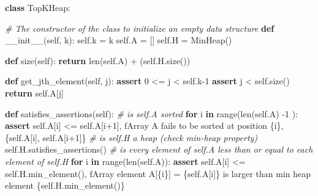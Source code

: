 \documentclass[
]{article}
\newenvironment{Shaded}{}{}
\newcommand{\BuiltInTok}[1]{\textcolor[rgb]{0.00,0.50,0.00}{#1}}
\newcommand{\CommentTok}[1]{\textcolor[rgb]{0.38,0.63,0.69}{\textit{#1}}}
\newcommand{\ControlFlowTok}[1]{\textcolor[rgb]{0.00,0.44,0.13}{\textbf{#1}}}
\newcommand{\DecValTok}[1]{\textcolor[rgb]{0.25,0.63,0.44}{#1}}
\newcommand{\FunctionTok}[1]{\textcolor[rgb]{0.02,0.16,0.49}{#1}}
\newcommand{\KeywordTok}[1]{\textcolor[rgb]{0.00,0.44,0.13}{\textbf{#1}}}
\newcommand{\NormalTok}[1]{#1}
\newcommand{\OperatorTok}[1]{\textcolor[rgb]{0.40,0.40,0.40}{#1}}
\newcommand{\SpecialCharTok}[1]{\textcolor[rgb]{0.25,0.44,0.63}{#1}}
\newcommand{\SpecialStringTok}[1]{\textcolor[rgb]{0.73,0.40,0.53}{#1}}
\newcommand{\VariableTok}[1]{\textcolor[rgb]{0.10,0.09,0.49}{#1}}
\begin{document}
\begin{Shaded}
\begin{Highlighting}[]
\KeywordTok{class}\NormalTok{ TopKHeap:}

    \CommentTok{\# The constructor of the class to initialize an empty data structure}
    \KeywordTok{def} \FunctionTok{\_\_init\_\_}\NormalTok{(}\VariableTok{self}\NormalTok{, k):}
        \VariableTok{self}\NormalTok{.k }\OperatorTok{=}\NormalTok{ k}
        \VariableTok{self}\NormalTok{.A }\OperatorTok{=}\NormalTok{ []}
        \VariableTok{self}\NormalTok{.H }\OperatorTok{=}\NormalTok{ MinHeap()}

    \KeywordTok{def}\NormalTok{ size(}\VariableTok{self}\NormalTok{):}
        \ControlFlowTok{return} \BuiltInTok{len}\NormalTok{(}\VariableTok{self}\NormalTok{.A) }\OperatorTok{+}\NormalTok{ (}\VariableTok{self}\NormalTok{.H.size())}

    \KeywordTok{def}\NormalTok{ get\_jth\_element(}\VariableTok{self}\NormalTok{, j):}
        \ControlFlowTok{assert} \DecValTok{0} \OperatorTok{\textless{}=}\NormalTok{ j }\OperatorTok{\textless{}} \VariableTok{self}\NormalTok{.k}\OperatorTok{{-}}\DecValTok{1}
        \ControlFlowTok{assert}\NormalTok{ j }\OperatorTok{\textless{}} \VariableTok{self}\NormalTok{.size()}
        \ControlFlowTok{return} \VariableTok{self}\NormalTok{.A[j]}

    \KeywordTok{def}\NormalTok{ satisfies\_assertions(}\VariableTok{self}\NormalTok{):}
        \CommentTok{\# is self.A sorted}
        \ControlFlowTok{for}\NormalTok{ i }\KeywordTok{in} \BuiltInTok{range}\NormalTok{(}\BuiltInTok{len}\NormalTok{(}\VariableTok{self}\NormalTok{.A) }\OperatorTok{{-}}\DecValTok{1}\NormalTok{ ):}
            \ControlFlowTok{assert} \VariableTok{self}\NormalTok{.A[i] }\OperatorTok{\textless{}=} \VariableTok{self}\NormalTok{.A[i}\OperatorTok{+}\DecValTok{1}\NormalTok{], }\SpecialStringTok{f\textquotesingle{}Array A fails to be sorted at position }\SpecialCharTok{\{}\NormalTok{i}\SpecialCharTok{\}}\SpecialStringTok{, }\SpecialCharTok{\{}\VariableTok{self}\SpecialCharTok{.}\NormalTok{A[i]}\SpecialCharTok{,} \VariableTok{self}\SpecialCharTok{.}\NormalTok{A[i}\OperatorTok{+}\DecValTok{1}\NormalTok{]}\SpecialCharTok{\}}\SpecialStringTok{\textquotesingle{}}
        \CommentTok{\# is self.H a heap (check min{-}heap property)}
        \VariableTok{self}\NormalTok{.H.satisfies\_assertions()}
        \CommentTok{\# is every element of self.A less than or equal to each element of self.H}
        \ControlFlowTok{for}\NormalTok{ i }\KeywordTok{in} \BuiltInTok{range}\NormalTok{(}\BuiltInTok{len}\NormalTok{(}\VariableTok{self}\NormalTok{.A)):}
            \ControlFlowTok{assert} \VariableTok{self}\NormalTok{.A[i] }\OperatorTok{\textless{}=} \VariableTok{self}\NormalTok{.H.min\_element(), }\SpecialStringTok{f\textquotesingle{}Array element A[}\SpecialCharTok{\{}\NormalTok{i}\SpecialCharTok{\}}\SpecialStringTok{] = }\SpecialCharTok{\{}\VariableTok{self}\SpecialCharTok{.}\NormalTok{A[i]}\SpecialCharTok{\}}\SpecialStringTok{ is larger than min heap element }\SpecialCharTok{\{}\VariableTok{self}\SpecialCharTok{.}\NormalTok{H}\SpecialCharTok{.}\NormalTok{min\_element()}\SpecialCharTok{\}}\SpecialStringTok{\textquotesingle{}}


\end{Highlighting}
\end{Shaded}
\end{document}

